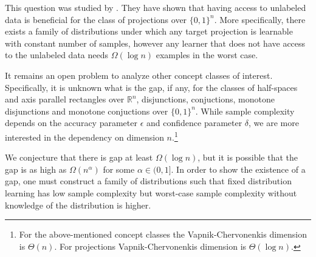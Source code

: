 \documentclass[12pt]{colt2019}
\newcommand{\R}{\mathbb{R}}
\begin{document}
This question was studied by \cite{}. They have shown that having access to
unlabeled data is beneficial for the class of projections over $\{0,1\}^n$. More
specifically, there exists a family of distributions under which any target
projection is learnable with constant number of samples, however any learner
that does not have access to the unlabeled data needs $\Omega(\log n)$ examples
in the worst case.

It remains an open problem to analyze other concept classes of interest.
Specifically, it is unknown what is the gap, if any, for the classes of
half-spaces and axis parallel rectangles over $\R^n$, disjunctions, conjuctions,
monotone disjunctions and monotone conjuctions over $\{0,1\}^n$. While sample
complexity depends on the accuracy parameter $\epsilon$ and confidence parameter
$\delta$, we are more interested in the dependency on dimension
$n$.\footnote{For the above-mentioned concept classes the Vapnik-Chervonenkis
dimension is $\Theta(n)$. For projections Vapnik-Chervonenkis dimension is
$\Theta(\log n)$.}

We conjecture that there is gap at least $\Omega(\log n)$, but it is possible
that the gap is as high as $\Omega(n^\alpha)$ for some $\alpha \in (0,1]$. In
order to show the existence of a gap, one must construct a family of
distributions such that fixed distribution learning has low sample complexity
but worst-case sample complexity without knowledge of the distribution is
higher.
\end{document}
